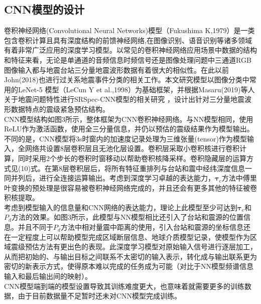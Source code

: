 \subsection{CNN模型的设计}
\indent 卷积神经网络(Convolutional Neural Networks)模型（Fukushima K,1979）是一类包含卷积计算且具有深度结构的前馈神经网络,在图像识别、语音识别等诸多领域有着非常广泛应用的深度学习模型。以常见的卷积神经网络应用场景中数据的结构和特征来看，无论是单通道的音频信息时频信号还是图像处理问题中三通道RGB图像输入都与地震台站三分量地震波形数据有着很大的相似性。在此以前John(2018)也进行过关系地震事件分类的相关工作。本文研究模型以图像分类中常用的LeNet-5 模型（LeCun Y et al.,1998）为基础框架，并根据Masaru(2019)等人关于地震问题特性进行SRSpec-CNN模型的相关研究 ，设计出针对三分量地震波形数据特点的震级紧急预估结构。\\
\indent CNN模型结构如图3所示，整体框架为CNN卷积神经网络。与NN模型相同，使用ReLU作为激活函数，使用全三分量信息，并仍以预估的震级结果作为模型输出。不同的是，CNN模型将3s时窗内的加速度记录处理为三维张量(tensor)作为模型输入，全网络共设置8层卷积层且无池化层设置。卷积层采取小卷积核进行卷积计算，同时采用2个步长的卷积时窗移动以帮助卷积核降采样。卷积隐藏层的运算方式见(10)式。在第8层卷积层后，将所有特征重排列与台站和震中经纬深度信息一同并列后，进行全连接运算输出。考虑到深度学习卓越的表达能力，$\mathbf{\tau}_{\mathrm{c}}$方法中傅里叶变换的预处理是很容易被卷积神经网络完成的，并且还会有更多其他的特征被卷积核提取。\\
\indent 考虑到模型输入的信息量和CNN网络的表达能力，理论上此模型至少可达到$\mathbf{\tau}_{\mathrm{c}}$和$P_{d}$方法的效果。如图3所示，此模型与NN模型相比还引入了台站和震源的位置信息。并且不同于$P_{d}$方法中相对量震中距离的使用，引入台站和震源的坐标信息还在一定程度上可以帮助模型完成区域断层信息、地球介质模型记录，使模型作为区域震级预估方法有更出色的表现。此深度学习模型对原始输入信号进行逐层加工，从而把初始的、与输出目标之间联系不太密切的输入表示，转化成与输出联系更为密切的新表示方式，使得原本难以完成的任务成为可能（对比于NN模型频谱信息输入和最后输出间的映射）。\\
\indent CNN模型端到端的模型设置导致其训练难度更大，也意味着就需要更多的训练数据，由于目前数据量不足暂时还未对CNN模型完成训练。\\
